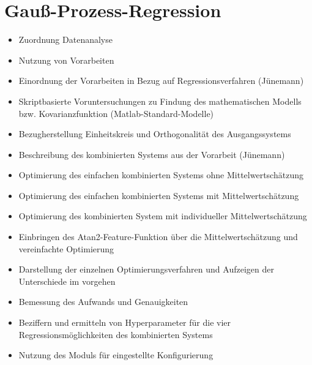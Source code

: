 \section{Gauß-Prozess-Regression}
	\begin{itemize}
		\item Zuordnung Datenanalyse
		\item Nutzung von Vorarbeiten
		\item Einordnung der Vorarbeiten in Bezug auf Regressionsverfahren (Jünemann)
		\item Skriptbasierte Voruntersuchungen zu Findung des mathematischen Modells bzw. Kovarianzfunktion (Matlab-Standard-Modelle)
		\item Bezugherstellung Einheitskreis und Orthogonalität des Ausgangssystems
		\item Beschreibung des kombinierten Systems aus der Vorarbeit (Jünemann)
		\item Optimierung des einfachen kombinierten Systems ohne Mittelwertschätzung
		\item Optimierung des einfachen kombinierten Systems mit Mittelwertschätzung
		\item Optimierung des kombinierten System mit individueller Mittelwertschätzung
		\item Einbringen des Atan2-Feature-Funktion über die Mittelwertschätzung und vereinfachte Optimierung
		\item Darstellung der einzelnen Optimierungsverfahren und Aufzeigen der Unterschiede im vorgehen
		\item Bemessung des Aufwands und Genauigkeiten
		\item Beziffern und ermitteln von Hyperparameter für die vier Regressionsmöglichkeiten des kombinierten Systems
 		\item Nutzung des Moduls für eingestellte Konfigurierung
	\end{itemize}
